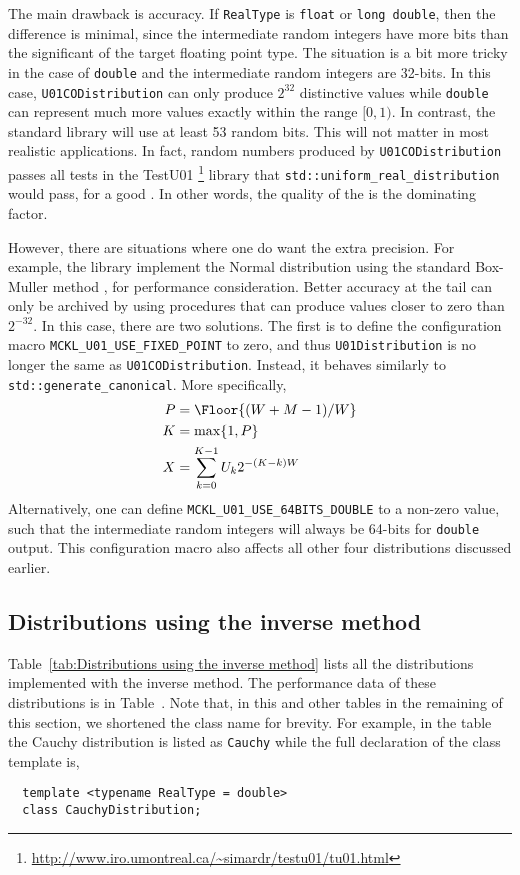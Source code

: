 The main drawback is accuracy. If \verb|RealType| is \verb|float| or
\verb|long double|, then the difference is minimal, since the intermediate
random integers have more bits than the significant of the target floating
point type. The situation is a bit more tricky in the case of \verb|double| and
the intermediate random integers are 32-bits. In this case,
\verb|U01CODistribution| can only produce $2^{32}$ distinctive values while
\verb|double| can represent much more values exactly within the range $[0, 1)$.
In contrast, the standard library will use at least 53 random bits. This will
not matter in most realistic applications. In fact, random numbers produced by
\verb|U01CODistribution| passes all tests in the {\lnfigures\tbfigures
  TestU01}%
\footnote{\url{http://www.iro.umontreal.ca/~simardr/testu01/tu01.html}} library
that \verb|std::uniform_real_distribution| would pass, for a good \rng. In
other words, the quality of the \rng is the dominating factor.

However, there are situations where one do want the extra precision. For
example, the library implement the Normal distribution using the standard
Box-Muller method \parencite{Box:1958hv}, for performance consideration. Better
accuracy at the tail can only be archived by using procedures that can produce
values closer to zero than $2^{-32}$. In this case, there are two solutions.
The first is to define the configuration macro
\verb|MCKL_U01_USE_FIXED_POINT| to zero, and thus \verb|U01Distribution| is no
longer the same as \verb|U01CODistribution|. Instead, it behaves similarly to
\verb|std::generate_canonical|. More specifically,
\begin{align*}
  P &= \Floor{(W + M - 1) / W} \\
  K &= \max\{1, P\} \\
  X &= \sum_{k=0}^{K - 1} U_k 2^{-(K - k)W}
\end{align*}
Alternatively, one can define \verb|MCKL_U01_USE_64BITS_DOUBLE| to a non-zero
value, such that the intermediate random integers will always be 64-bits for
\verb|double| output. This configuration macro also affects all other four
distributions discussed earlier.

\subsection{Distributions using the inverse method}
\label{sub:Distributions using the inverse method}

Table~\ref{tab:Distributions using the inverse method} lists all the
distributions implemented with the inverse method. The performance data of
these distributions is in Table~. Note that, in this and other tables in the remaining of
this section, we shortened the class name for brevity. For example, in the
table the Cauchy distribution is listed as \verb|Cauchy| while the full
declaration of the class template is,
\begin{Verbatim}
  template <typename RealType = double>
  class CauchyDistribution;
\end{Verbatim}


